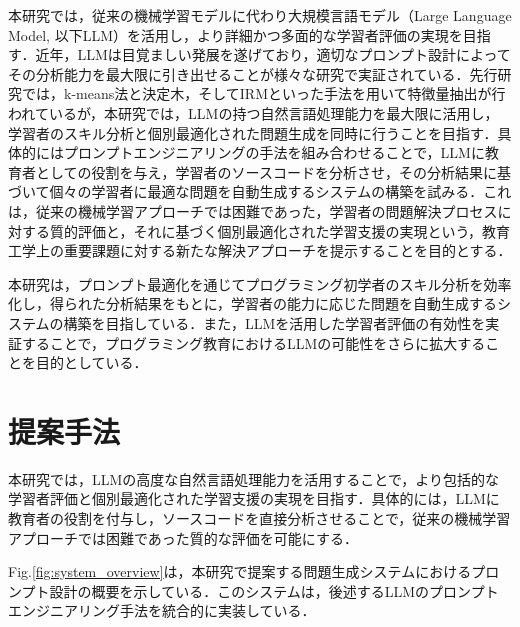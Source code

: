 \documentclass[twocolumn, fleqn, uplatex]{jsarticle}
\begin{document}
本研究では，従来の機械学習モデルに代わり大規模言語モデル（Large Language Model, 以下LLM）を活用し，より詳細かつ多面的な学習者評価の実現を目指す．近年，LLMは目覚ましい発展を遂げており，適切なプロンプト設計によってその分析能力を最大限に引き出せることが様々な研究で実証されている\cite{prompting servey}．先行研究では，k-means法と決定木，そしてIRMといった手法を用いて特徴量抽出が行われているが，本研究では，LLMの持つ自然言語処理能力を最大限に活用し，学習者のスキル分析と個別最適化された問題生成を同時に行うことを目指す．具体的にはプロンプトエンジニアリングの手法を組み合わせることで，LLMに教育者としての役割を与え，学習者のソースコードを分析させ，その分析結果に基づいて個々の学習者に最適な問題を自動生成するシステムの構築を試みる．これは，従来の機械学習アプローチでは困難であった，学習者の問題解決プロセスに対する質的評価と，それに基づく個別最適化された学習支援の実現という，教育工学上の重要課題に対する新たな解決アプローチを提示することを目的とする．

本研究は，プロンプト最適化を通じてプログラミング初学者のスキル分析を効率化し，得られた分析結果をもとに，学習者の能力に応じた問題を自動生成するシステムの構築を目指している．また，LLMを活用した学習者評価の有効性を実証することで，プログラミング教育におけるLLMの可能性をさらに拡大することを目的としている．

\section{提案手法}
本研究では，LLMの高度な自然言語処理能力を活用することで，より包括的な学習者評価と個別最適化された学習支援の実現を目指す．具体的には，LLMに教育者の役割を付与し，ソースコードを直接分析させることで，従来の機械学習アプローチでは困難であった質的な評価を可能にする．

Fig.\ref{fig:system_overview}は，本研究で提案する問題生成システムにおけるプロンプト設計の概要を示している．このシステムは，後述するLLMのプロンプトエンジニアリング手法を統合的に実装している．
\end{document}
